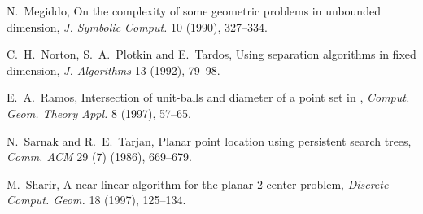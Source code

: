 \documentclass[a4paper,12pt]{article}
\begin{document}
\begin{thebibliography}{}
N.~Megiddo, On the complexity of some geometric problems in unbounded dimension,
{\it J. Symbolic Comput.} 10 (1990), 327--334.

C.~H.~Norton, S.~A.~Plotkin and E.~Tardos,
Using separation algorithms in fixed dimension,
{\it J. Algorithms} 13 (1992), 79--98.

E.~A.~Ramos,
Intersection of unit-balls and diameter of a point set in ,
{\it Comput. Geom. Theory Appl.} 8 (1997), 57--65.

N.~Sarnak and R.~E.~Tarjan,
Planar point location using persistent search trees,
{\it Comm. ACM} 29 (7) (1986), 669--679.

M.~Sharir,
A near linear algorithm for the planar 2-center problem,
{\it Discrete Comput. Geom.} 18 (1997), 125--134.

\end{thebibliography}
\end{document}
